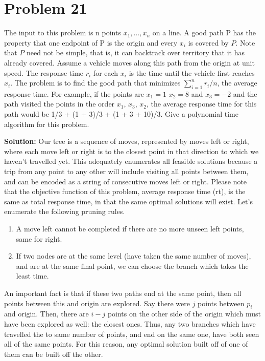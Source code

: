 \documentclass{article}
\providecommand{\prob}[1]{\section*{Problem #1}}
\providecommand{\soln}{\textbf{Solution: }}
\begin{document}
\pagebreak
\prob{21}
The input to this problem is n points $x_1, \dots , x_n$ on a line. A good path P has the property that one endpoint of P is the origin and every $x_i$ is covered by $P$. Note that $P$ need not be simple, that is, it can backtrack over territory that it has already covered. Assume a vehicle moves along this path from the origin at unit speed. The response time $r_i$ for each $x_i$ is the time until the vehicle first reaches $x_i$. The problem is to find the good path that minimizes $\sum_{i=1}^n r_i/n$, the average response time.
For example, if the points are $x_1 = 1$ $x_2 = 8$ and $x_3 = −2$ and the path visited the points in the order $x_1$, $x_3$, $x_2$, the average response time for this path would be 1/3 + (1 + 3)/3 + (1 + 3 + 10)/3. Give a polynomial time algorithm for this problem.

\soln Our tree is a sequence of moves, represented by moves left or right, where each move left or right is to the closest point in that direction to which we haven't travelled yet.
This adequately enumerates all feasible solutions because a trip from any point to any other will include visiting all points between them, and can be encoded as a string of consecutive moves left or right.
Please note that the objective function of this problem, average response time (rt), is the same as total response time, in that the same optimal solutions will exist.
Let's enumerate the following pruning rules.

\begin{enumerate}
    \item A move left cannot be completed if there are no more unseen left points, same for right.
    \item If two nodes are at the same level (have taken the same number of moves), and are at the same final point, we can choose the branch which takes the least time.
\end{enumerate}

An important fact is that if these two paths end at the same point, then all points between this and origin are explored.
Say there were $j$ points between $p_i$ and origin. Then, there are $i - j$ points on the other side of the origin which must have been explored as well: the closest ones.
Thus, any two branches which have travelled the to same number of points, and end on the same one, have both seen all of the same points.
For this reason, any optimal solution built off of one of them can be built off the other.
\end{document}
